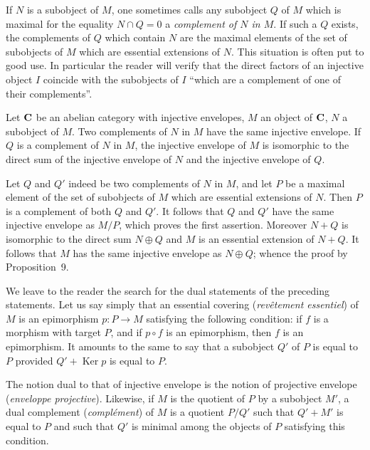 If $N$ is a subobject of $M$, one sometimes calls any subobject $Q$ of
$M$ which is maximal for the equality $N\cap Q = 0$ a \emph{complement
of $N$ in $M$}. If such a $Q$ exists, the complements of $Q$ which
contain $N$ are the maximal elements of the set of subobjects of $M$
which are essential extensions of $N$. This situation is often put to
good use. In particular the reader will verify that the direct factors
of an injective object $I$ coincide with the subobjects of $I$ ``which
are a complement of one of their complements''.

\begin{proposition}
Let $\mathbf{C}$ be an abelian category with injective envelopes, $M$ an
object of $\mathbf{C}$, $N$ a subobject of $M$. Two complements of $N$ in
$M$ have the same injective envelope. If $Q$ is a complement of $N$
in $M$, the injective envelope of $M$ is isomorphic to the direct sum
of the injective envelope of $N$ and the injective envelope of $Q$.
\end{proposition}

Let $Q$ and $Q'$ indeed be two complements of $N$ in $M$, and let $P$
be a maximal element of the set of subobjects of $M$ which are
essential extensions of $N$. Then $P$ is a complement of both $Q$ and
$Q'$. It follows that $Q$ and $Q'$ have the same injective envelope as
$M/P$, which proves the first assertion. Moreover $N + Q$ is
isomorphic to the direct sum $N\oplus Q$ and $M$ is an essential
extension of $N + Q$. It follows that $M$ has the same injective
envelope as $N\oplus Q$; whence the proof by Proposition~9.

We leave to the reader the search for the dual statements of the
preceding statements. Let us say simply that an essential covering
(\emph{revêtement essentiel}) of $M$ is an epimorphism
$p\colon P\to M$ satisfying the following condition: if $f$ is a
morphism with target $P$, and if $p\circ f$ is an epimorphism, then
$f$ is an epimorphism. It amounts to the same to say that a subobject
$Q'$ of $P$ is equal to $P$ provided $Q' + \operatorname{Ker}p$ is
equal to $P$.

The notion dual to that of injective envelope is the notion of
projective envelope (\emph{enveloppe projective}). Likewise, if $M$
is the quotient of $P$ by a subobject $M'$, a dual complement
(\emph{complément}) of $M$ is a quotient $P/Q'$ such that
$Q' + M'$ is equal to $P$ and such that $Q'$ is minimal among the
objects of $P$ satisfying this condition.
